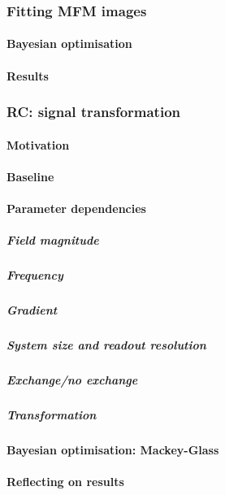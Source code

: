 \subsubsection{Fitting MFM images}\label{sec:3:OOP:MFM}
\paragraph{Bayesian optimisation}
\paragraph{Results} %
\subsubsection{RC: signal transformation}
\paragraph{Motivation} %
\paragraph{Baseline}
\paragraph{Parameter dependencies}
\subparagraph{Field magnitude}
\subparagraph{Frequency}
\subparagraph{Gradient}
\subparagraph{System size and readout resolution}
\subparagraph{Exchange/no exchange}
\subparagraph{Transformation}
\paragraph{Bayesian optimisation: Mackey-Glass}
\paragraph{Reflecting on results} %
